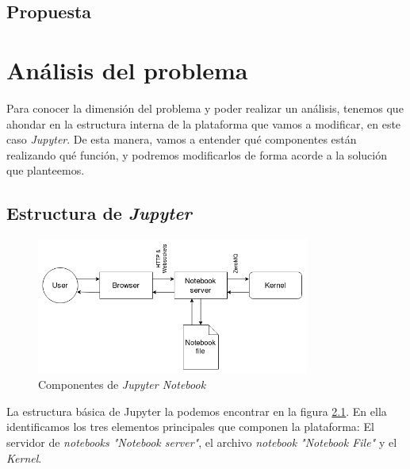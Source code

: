 \documentclass[11pt,spanish,listoffigures,listoftables]{tfgetsinf}
\begin{document}
\section{Propuesta}
\label{sec:propuesta}





\chapter{Análisis del problema}
\label{ch:analisis-problema}

Para conocer la dimensión del problema y poder realizar un análisis, tenemos que ahondar en la estructura interna de la plataforma que vamos a modificar, en este caso \textit{Jupyter}. De esta manera, vamos a entender qué componentes están realizando qué función, y podremos modificarlos de forma acorde a la solución que planteemos.



\section{Estructura de \textit{Jupyter}}
\label{sec:estructura-jupyter}

\begin{figure}[h]
  \centering
  \includegraphics[width=0.8\textwidth]{jupy.png}
  \caption{Componentes de \textit{Jupyter Notebook}}
  \label{fig:components}
\end{figure}

La estructura básica de Jupyter la podemos encontrar en la figura \ref{fig:components}. En ella identificamos los tres elementos principales que componen la plataforma: El servidor de \textit{notebooks "Notebook server"}, el archivo \textit{notebook "Notebook File"} y el \textit{Kernel}. 
\end{document}
